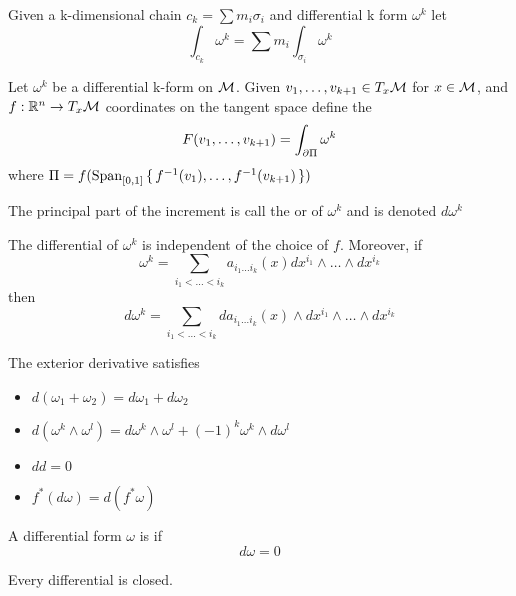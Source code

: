 \documentclass{article}
\begin{document}
\begin{definition}
Given a k-dimensional chain $c_k = \sum m_i \sigma_i $ and differential k form $\omega^k$ let 
\[
\int_{c_k} \omega^k = \sum m_i \int_{\sigma_i} \omega^k 
\]
\end{definition}

\begin{definition}[Increment]
Let $\omega^k$ be a differential k-form on $\mathcal{M}$. Given $v_1, \dots, v_{k+1} \in T_x \mathcal{M}$ for $x\in\mathcal{M}$, and $f:\mathbb{R}^n \to T_x\mathcal{M}$ coordinates on the tangent space define the  
\[
F(v_1, \dots, v_{k+1}) = \int_{\partial\Pi} \omega^k
\]
where $\Pi = f(\operatorname{Span}_{[0,1]}\set{f^{-1}(v_1),\dots,f^{-1}(v_{k+1})})$
\end{definition}

\begin{definition}
The principal part of the increment is call the  or  of $\omega^k$ and is denoted $d\omega^k$
\end{definition}

\begin{theorem}
The differential of $\omega^k$ is independent of the choice of $f$. Moreover, if 
\[
\omega^k = \sum_{i_1<\dots<i_k} a_{i_1 \dots i_k}(x) dx^{i_1} \wedge \dots \wedge dx^{i_k}
\]
then 
\[
d\omega^k = \sum_{i_1<\dots<i_k} da_{i_1 \dots i_k}(x) \wedge dx^{i_1} \wedge \dots \wedge dx^{i_k}
\]
\end{theorem}

\begin{theorem}
The exterior derivative satisfies
\begin{itemize}
    \item $d(\omega_1 + \omega_2) = d\omega_1 + d\omega_2$
    \item $d(\omega^k \wedge \omega^l) = d\omega^k \wedge \omega^l + (-1)^k \omega^k \wedge d\omega^l $
    \item $dd=0$
    \item $f^\ast (d\omega) = d(f^\ast \omega)$
\end{itemize}
\end{theorem}

\begin{definition}[Closed]
A differential form $\omega$ is  if 
\[
d\omega = 0
\]
\end{definition}

\begin{theorem}
Every differential is closed. 
\end{theorem}
\end{document}

